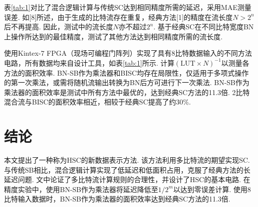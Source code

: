 \documentclass{solitairemiya-art}
\begin{document}
表\ref{tab:1}对比了混合逻辑计算与传统SC达到相同精度所需的延迟，采用MAE测量误差. 如[8]所述，由于生成的比特流存在重复，经典方法[1]的精度在流长度$N > 2^n$后不再提高. 因此，测试中的流长度$N$亦不超过$2^n$. 基于经典SC在不同比特宽度BN上操作所达到的最佳精度，测试了其他方法达到相同精度所需的流长度. 

使用Kintex-7 FPGA（现场可编程门阵列）实现了具有8比特数据输入的不同方法电路，所有数据均来自设计工具，如表\ref{tab:1}所示. 计算$(\text{LUT} \times N)^{-1}$以测量各方法的面积效率. BN-SB作为乘法器和BISC均存在局限性，仅适用于多项式操作的第一次乘法，或需将随机流输出转换为BN后方可进行下一次乘法. BN-SB作为乘法器的面积效率是测试中所有方法中最优的，达到经典SC方法的11.3倍. 2比特混合流与BISC的面积效率相近，相较于经典SC提高了约30\%. 

\section{结论}

本文提出了一种称为HSC的新数据表示方法. 该方法利用多比特流的期望实现SC. 与传统SB相比，混合逻辑计算实现了低延迟和低面积占用，克服了经典方法的长延迟问题. 文中论证了多比特流计算规则的合理性，并设计了HSC的基本电路. 在精度实验中，使用BN-SB作为乘法器将延迟降低至$1/2^m$以达到零误差计算. 使用8比特输入数据时，BN-SB作为乘法器的面积效率达到经典SC方法的11.3倍. 
\end{document}
